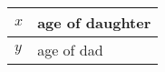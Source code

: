 \begin{table}[H]
    \centering
    \begin{tabular}{|l|l|}
    \hline
      $x$   & age of daughter \\
      \hline
      $y$   & age of dad \\
      \hline
    \end{tabular}
    \label{tab:tables/table.tex}
\end{table}
